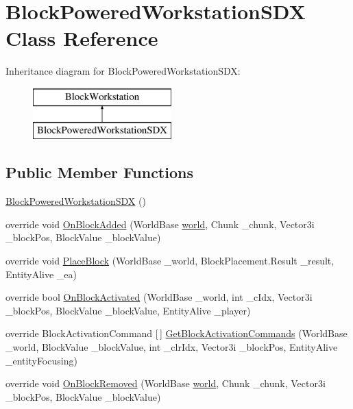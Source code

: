\hypertarget{class_block_powered_workstation_s_d_x}{}\section{Block\+Powered\+Workstation\+S\+DX Class Reference}
\label{class_block_powered_workstation_s_d_x}
Inheritance diagram for Block\+Powered\+Workstation\+S\+DX\+:\begin{figure}[H]
\begin{center}
\leavevmode
\includegraphics[height=2.000000cm]{class_block_powered_workstation_s_d_x}
\end{center}
\end{figure}
\subsection*{Public Member Functions}
\begin{DoxyCompactItemize}
\item 
\mbox{\hyperlink{class_block_powered_workstation_s_d_x_afed7f31e6bd7d45885b86ff818ffbf6d}{Block\+Powered\+Workstation\+S\+DX}} ()
\item 
override void \mbox{\hyperlink{class_block_powered_workstation_s_d_x_a7b62e07a42da3cb89ce0e47df42ab341}{On\+Block\+Added}} (World\+Base \mbox{\hyperlink{_sphere_i_i_01_music_01_boxes_2_config_2_localization_8txt_a7ede01351426b1b7f6c1ce5f794e474f}{world}}, Chunk \+\_\+chunk, Vector3i \+\_\+block\+Pos, Block\+Value \+\_\+block\+Value)
\item 
override void \mbox{\hyperlink{class_block_powered_workstation_s_d_x_ab4cdc00b9a432a250cc3e733286c41cd}{Place\+Block}} (World\+Base \+\_\+world, Block\+Placement.\+Result \+\_\+result, Entity\+Alive \+\_\+ea)
\item 
override bool \mbox{\hyperlink{class_block_powered_workstation_s_d_x_a04b461d7ce4512b302f5689850adb1ae}{On\+Block\+Activated}} (World\+Base \+\_\+world, int \+\_\+c\+Idx, Vector3i \+\_\+block\+Pos, Block\+Value \+\_\+block\+Value, Entity\+Alive \+\_\+player)
\item 
override Block\+Activation\+Command \mbox{[}$\,$\mbox{]} \mbox{\hyperlink{class_block_powered_workstation_s_d_x_a3faadfd678821f8a708299a5d5d5a9a9}{Get\+Block\+Activation\+Commands}} (World\+Base \+\_\+world, Block\+Value \+\_\+block\+Value, int \+\_\+clr\+Idx, Vector3i \+\_\+block\+Pos, Entity\+Alive \+\_\+entity\+Focusing)
\item 
override void \mbox{\hyperlink{class_block_powered_workstation_s_d_x_aba18512171241067d4337d684d56b556}{On\+Block\+Removed}} (World\+Base \mbox{\hyperlink{_sphere_i_i_01_music_01_boxes_2_config_2_localization_8txt_a7ede01351426b1b7f6c1ce5f794e474f}{world}}, Chunk \+\_\+chunk, Vector3i \+\_\+block\+Pos, Block\+Value \+\_\+block\+Value)
\end{DoxyCompactItemize}


